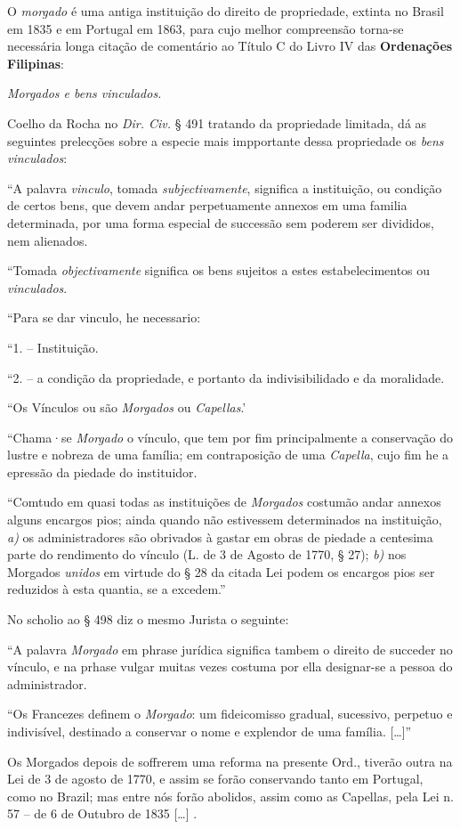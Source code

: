 O \textit{morgado} é uma antiga instituição do direito de propriedade, extinta no Brasil em 1835 e em Portugal em 1863, para cujo melhor compreensão torna-se necessária longa citação de comentário ao Título C do Livro IV das \textbf{Ordenações Filipinas}: 

\begin{citacao}
\textit{Morgados e bens vinculados.}

Coelho da Rocha no \textit{Dir. Civ.} § 491 tratando da propriedade limitada, dá as seguintes prelecções sobre a especie mais impportante dessa propriedade os \textit{bens vinculados}:

``A palavra \textit{vinculo}, tomada \textit{subjectivamente}, significa a instituição, ou condição de certos bens, que devem andar perpetuamente annexos em uma familia determinada, por uma forma especial de successão sem poderem ser divididos, nem alienados.

``Tomada \textit{objectivamente} significa os bens sujeitos a estes estabelecimentos ou \textit{vinculados}.

``Para se dar vinculo, he necessario:

``1. -- Instituição.

``2. -- a condição da propriedade, e portanto da indivisibilidado e da moralidade.

``Os Vínculos ou são \textit{Morgados} ou \textit{Capellas}.'

``Chama·se \textit{Morgado} o vínculo, que tem por fim principalmente a conservação do lustre e nobreza de uma família; em contraposição de uma \textit{Capella}, cujo fim he a epressão da piedade do instituidor.

``Comtudo em quasi todas as instituições de \textit{Morgados} costumão andar annexos alguns encargos pios; ainda quando não estivessem determinados na instituição, \textit{a)} os administradores são obrivados à gastar em obras de piedade a centesima parte do rendimento do vínculo (L. de 3 de Agosto de 1770, § 27); \textit{b)} nos Morgados \textit{unidos} em virtude do § 28 da citada Lei podem os encargos pios ser reduzidos à esta quantia, se a excedem.''

No scholio ao § 498 diz o mesmo Jurista o seguinte:

``A palavra \textit{Morgado} em phrase jurídica significa tambem o direito de succeder no vínculo, e na prhase vulgar muitas vezes costuma por ella designar-se a pessoa do administrador.

``Os Francezes definem o \textit{Morgado}: um fideicomisso gradual, sucessivo, perpetuo e indivisível, destinado a conservar o nome e explendor de uma família. [\dots]''

Os Morgados depois de soffrerem uma reforma na presente Ord., tiverão outra na Lei de 3 de agosto de 1770, e assim se forão conservando tanto em Portugal, como no Brazil; mas entre nós forão abolidos, assim como as Capellas, pela Lei n. 57 -- de 6 de Outubro de 1835 [\dots] \cite[p.~990]{ordfil_1870}. 
\end{citacao}

